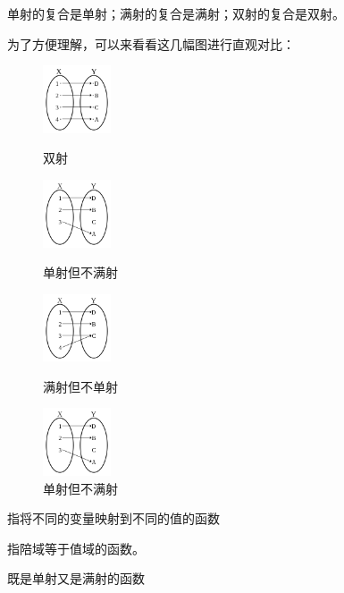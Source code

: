 \documentclass[
	11pt, %
	fleqn, %
	a4paper, %
]{LegrandOrangeBook}
\begin{document}
\begin{theorem}
	单射的复合是单射；满射的复合是满射；双射的复合是双射。
\end{theorem}
为了方便理解，可以来看看这几幅图进行直观对比：
\begin{figure}[H]
	\centering
	\centering
	\begin{minipage}[t]{0.25\textwidth}
		\centering
		\includegraphics[width=2cm]{Images/Bijection.svg.png}
		\caption{双射}
	\end{minipage}
	\begin{minipage}[t]{0.23\textwidth}
		\centering
		\includegraphics[width=2cm]{Images/240px-Injection.svg.png}
		\caption{单射但不满射}
	\end{minipage}
	\begin{minipage}[t]{0.23\textwidth}
		\centering
		\includegraphics[width=2cm]{Images/240px-Surjection.svg.png}
		\caption{满射但不单射}
	\end{minipage}
	\begin{minipage}[t]{0.23\textwidth}
		\centering
		\includegraphics[width=2cm]{Images/240px-Injection.svg.png}
		\caption{单射但不满射}
	\end{minipage}
\end{figure}

\begin{vocabulary}[单射]
	指将不同的变量映射到不同的值的函数
\end{vocabulary}

\begin{vocabulary}[满射]
	指陪域等于值域的函数。
\end{vocabulary}
\begin{vocabulary}[双射]
	既是单射又是满射的函数
\end{vocabulary}
\end{document}
